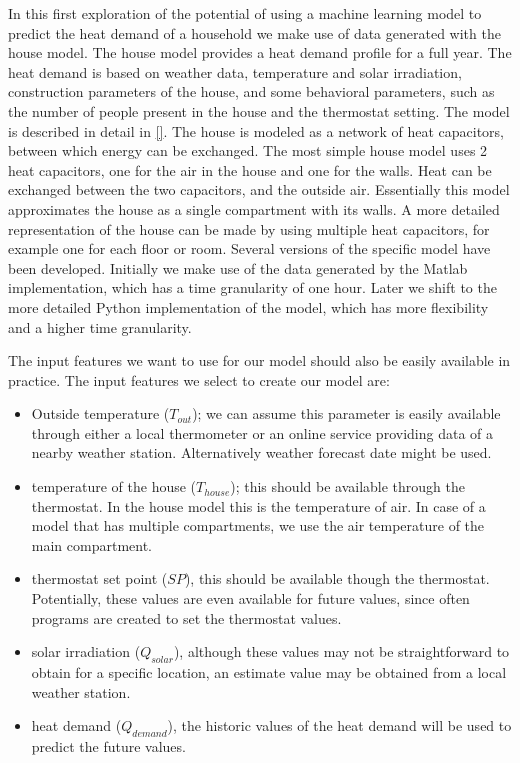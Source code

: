 In this first exploration of the potential of using a machine learning model to predict the heat demand of a household we make use of data generated with the house model. The house model provides a heat demand profile for a full year. The heat demand is based on weather data, temperature and solar irradiation, construction parameters of the house, and some behavioral parameters, such as the number of people present in the house and the thermostat setting.   
The model is described in detail in \ref{}. The house is modeled as a network of heat capacitors, between which energy can be exchanged. The most simple house model uses 2 heat capacitors, one for the air in the house and one for the walls. Heat can be exchanged between the two capacitors, and the outside air. Essentially this model approximates the house as a single compartment with its walls. 
A more detailed representation of the house can be made by using multiple heat capacitors, for example one for each floor or room.   
Several versions of the specific model have been developed. Initially we make use of the data generated by the Matlab implementation, which has a time granularity of one hour. Later we shift to the more detailed Python implementation of the model, which has more flexibility and a higher time granularity.

The input features we want to use for our model should also be easily available in practice. The input features we select to create our model are:
\begin{itemize}
\item Outside temperature ($T_{out}$); we can assume this parameter is easily available through either a local thermometer or an online service providing data of a nearby weather station. Alternatively weather forecast date might be used. 
\item temperature of the house ($T_{house}$); this should be available through the thermostat. In the house model this is the temperature of air. In case of a model that has multiple compartments, we use the air temperature of the main compartment.
\item thermostat set point ($SP$), this should be available though the thermostat. Potentially, these values are even available for future values, since often programs are created to set the thermostat values. 
\item solar irradiation ($Q_{solar}$), although these values may not be straightforward to obtain for a specific location, an estimate value may be obtained from a local weather station. 
\item heat demand ($Q_{demand}$), the historic values of the heat demand will be used to predict the future values. 
\end{itemize}

